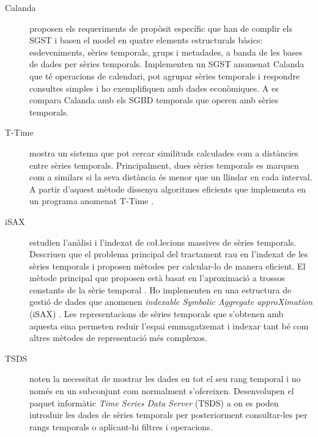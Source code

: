 \begin{description}

\item[Calanda] \textcite{dreyer94} proposen els requeriments de propòsit específic que han de complir els SGST i basen el model en quatre elements estructurals bàsics: esdeveniments, sèries temporals, grups i metadades, a banda de les bases de dades per sèries temporals. Implementen un SGST anomenat Calanda \parencite{dreyer94b,dreyer95,dreyer95b} que té operacions de calendari, pot agrupar sèries temporals i respondre consultes simples i ho exemplifiquen amb dades econòmiques. A \cite{schmidt95} es compara Calanda amb els SGBD temporals que operen amb sèries temporals. 




\item[T-Time] \textcite{assfalg08:thesis} mostra un sistema que pot cercar similituds calculades com a distàncies entre sèries temporals. Principalment, dues sèries temporals es marquen com a similars si la seva distància és menor que un llindar en cada interval. A partir d'aquest mètode dissenya algoritmes eficients que implementa en un programa anomenat T-Time \parencite{assfalg08:ttime}.


 
\item[iSAX] \textcite{keogh08:isax,keogh10:isax} estudien l'anàlisi i l'indexat de co\l.lecions massives de sèries temporals. Descriuen que el problema principal del tractament rau en l'indexat de les sèries temporals i proposen mètodes per calcular-lo de manera eficient. El mètode principal que proposen està basat en l'aproximació a trossos constants de la sèrie temporal \parencite{keogh00}.  Ho implementen en una estructura de gestió de dades que anomenen \emph{indexable Symbolic Aggregate approXimation} (iSAX) \parencite{isax}. Les representacions de sèries temporals que s'obtenen amb aquesta eina permeten reduir l'espai emmagatzemat i indexar tant bé com altres mètodes de representació més complexos.





\item[TSDS]
\textcite{weigel10} noten la necessitat de mostrar les dades en tot el seu rang temporal i no només en un subconjunt com normalment s'ofereixen. Desenvolupen el paquet informàtic \emph{Time Series Data Server} (TSDS) \parencite{tsds} a on es poden introduir les dades de sèries temporals per posteriorment consultar-les per rangs temporals o aplicant-hi filtres i operacions.






\end{description}
